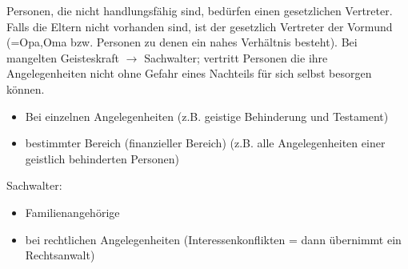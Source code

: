 \documentclass[a4paper]{report}
\begin{document}
Personen, die nicht handlungsfähig sind, bedürfen einen gesetzlichen Vertreter. Falls die Eltern nicht vorhanden sind, ist der gesetzlich Vertreter der Vormund (=Opa,Oma bzw. Personen zu denen ein nahes Verhältnis besteht). Bei mangelten Geisteskraft $\rightarrow$ Sachwalter; vertritt Personen die ihre Angelegenheiten nicht ohne Gefahr eines Nachteils für sich selbst besorgen können. 
\begin{itemize}
\item Bei einzelnen Angelegenheiten (z.B. geistige Behinderung und Testament)
\item bestimmter Bereich (finanzieller Bereich) (z.B. alle Angelegenheiten einer geistlich behinderten Personen)
\end{itemize}

Sachwalter:

\begin{itemize}
\item Familienangehörige
\item bei rechtlichen Angelegenheiten (Interessenkonflikten = dann übernimmt ein Rechtsanwalt)
\end{itemize}
\end{document}

